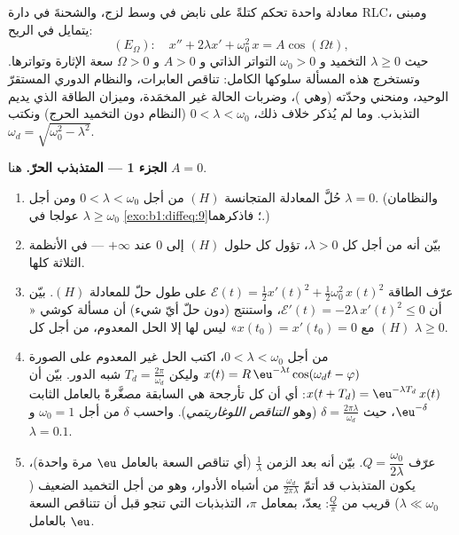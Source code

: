 \begin{problem}\label{pb:b1:diffeq:1}
معادلة واحدة تحكم كتلةً على نابض في وسط لزج، والشحنةَ
في دارة RLC، ومبنى يتمايل في الريح:
\[
(E_\Omega)\colon\quad
x'' + 2\lambda x' + \omega_0^2\,x = A\cos(\Omega t),
\]
حيث $\lambda \geq 0$ التخميد و $\omega_0 > 0$ التواتر
الذاتي و $A > 0$ و $\Omega > 0$ سعة الإثارة وتواترها.
وتستخرج هذه المسألة سلوكها الكامل: تناقص
العابرات، والنظام الدوري المستقرّ الوحيد، ومنحني 
وحدّته (وهي \emph{})، وضربات الحالة غير
المخمَدة، وميزان الطاقة الذي يديم
التذبذب.
وما لم يُذكر خلاف ذلك، $0 < \lambda < \omega_0$ (النظام دون
التخميد الحرج) ونكتب $\omega_d = \sqrt{\omega_0^2 - \lambda^2}$.

\medskip
\noindent\textbf{الجزء 1 --- المتذبذب الحرّ.} هنا $A = 0$.
\begin{enumerate}
  \item حُلَّ المعادلة المتجانسة $(H)$ من أجل $0 < \lambda <
        \omega_0$ ومن أجل $\lambda = 0$. (والنظامان $\lambda
        \geq \omega_0$ عولجا في \cref{exo:b1:diffeq:9}؛
        فاذكرهما.)
  \item بيّن أنه من أجل كل $\lambda > 0$، تؤول كل حلول $(H)$
        إلى $0$ عند $+\infty$ --- في الأنظمة الثلاثة كلها.
  \item عرّف الطاقة $\mathcal E(t) = \frac12 x'(t)^2 +
        \frac12\omega_0^2\,x(t)^2$ على طول حلّ للمعادلة $(H)$. بيّن أن
        $\mathcal E'(t) = -2\lambda\,x'(t)^2 \leq 0$، واستنتج
        (دون حلّ أيّ شيء) أن مسألة كوشي
        «$(H)$ مع $x(t_0) = x'(t_0) = 0$» ليس لها إلا الحل
        المعدوم، من أجل كل $\lambda \geq 0$.
  \item من أجل $0 < \lambda < \omega_0$، اكتب الحل غير المعدوم على الصورة
        $x(t) = R\,\eu^{-\lambda t}\cos(\omega_d t - \varphi)$ وليكن
        $T_d = \frac{2\pi}{\omega_d}$ شبه الدور.
        بيّن أن $x(t + T_d) = \eu^{-\lambda T_d}\,x(t)$: أي أن كل
        تأرجحة هي السابقة مصغَّرةً بالعامل الثابت
        $\eu^{-\delta}$، حيث $\delta = \frac{2\pi\lambda}{\omega_d}$
        (وهو \emph{التناقص اللوغاريتمي}). واحسب $\delta$ من أجل
        $\omega_0 = 1$ و $\lambda = 0.1$.
  \item عرّف \emph{} $Q =
        \dfrac{\omega_0}{2\lambda}$. بيّن
        أنه بعد الزمن $\frac1\lambda$ (أي تناقص السعة بالعامل
        $\eu$ مرة واحدة)، يكون المتذبذب قد أتمّ
        $\frac{\omega_d}{2\pi\lambda}$ من أشباه الأدوار، وهو من أجل
        التخميد الضعيف ($\lambda \ll \omega_0$) قريب من
        $\frac Q\pi$:  يعدّ، بمعامل $\pi$،
        التذبذبات التي تنجو قبل أن تتناقص السعة بالعامل
        $\eu$.
\end{enumerate}


\end{problem}
